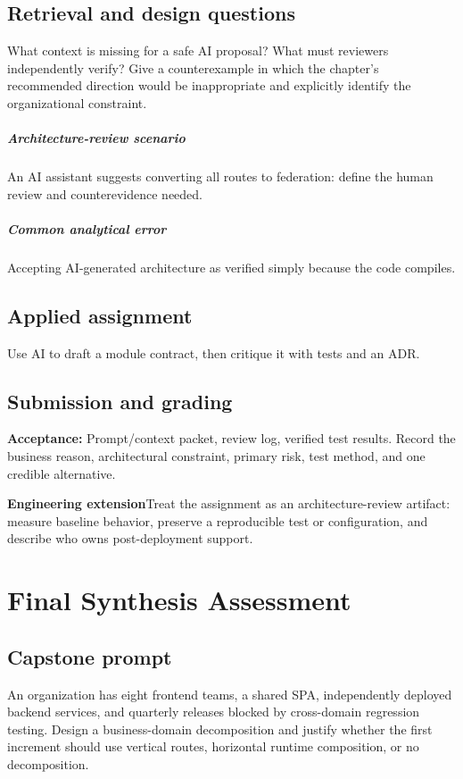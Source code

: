 \documentclass[11pt,letterpaper,oneside]{report}
\newcommand{\criterion}[1]{\textbf{Acceptance:} #1}
\begin{document}
\section{Retrieval and design questions}
What context is missing for a safe AI proposal? What must reviewers independently verify? Give a counterexample in which the chapter's recommended direction would be inappropriate and explicitly identify the organizational constraint.
\paragraph{Architecture-review scenario} An AI assistant suggests converting all routes to federation: define the human review and counterevidence needed.
\paragraph{Common analytical error} Accepting AI-generated architecture as verified simply because the code compiles.
\section{Applied assignment}
Use AI to draft a module contract, then critique it with tests and an ADR.
\section{Submission and grading}
\criterion{Prompt/context packet, review log, verified test results. Record the business reason, architectural constraint, primary risk, test method, and one credible alternative.}
\begin{engineerbox}\textbf{Engineering extension}\newline Treat the assignment as an architecture-review artifact: measure baseline behavior, preserve a reproducible test or configuration, and describe who owns post-deployment support.\end{engineerbox}

\chapter*{Final Synthesis Assessment}
\section*{Capstone prompt}
An organization has eight frontend teams, a shared SPA, independently deployed backend services, and quarterly releases blocked by cross-domain regression testing. Design a business-domain decomposition and justify whether the first increment should use vertical routes, horizontal runtime composition, or no decomposition.
\end{document}
